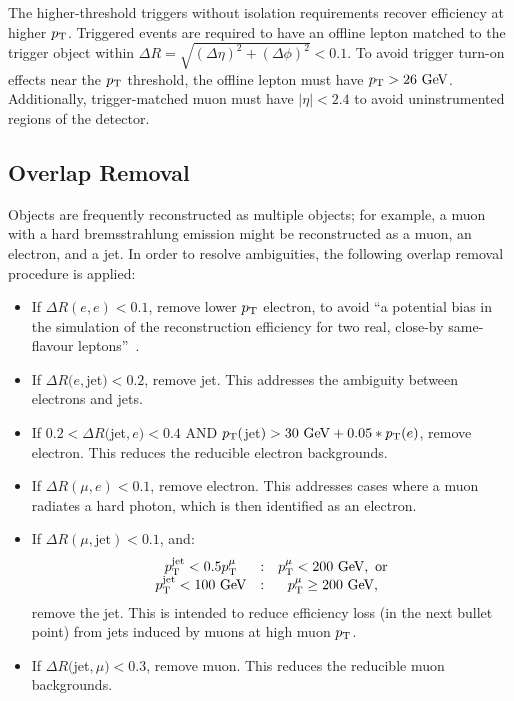 The higher-threshold triggers without isolation requirements recover efficiency at higher $p_{\text{T}}$. Triggered events are required to have an offline lepton matched to the trigger object within $\Delta R=\sqrt{(\Delta\eta)^2+(\Delta\phi)^2} < 0.1$. To avoid trigger turn-on effects near the $p_{\text{T}}$ threshold, the offline lepton must have $\pt>26 \GeV$. Additionally, trigger-matched muon must have $|\eta|<2.4$ to avoid uninstrumented regions of the detector.


\subsection{Overlap Removal}\label{sec:model-independent-overlap-removal}
Objects are frequently reconstructed as multiple objects; for example, a muon with a hard bremsstrahlung emission might be reconstructed as a muon, an electron, and a jet. In order to resolve ambiguities, the following overlap removal procedure is applied:

\begin{itemize}
	\item If $\Delta R(e, e) < 0.1$, remove lower $p_{\text{T}}$ electron, to avoid ``a potential bias in the simulation of the reconstruction efficiency for two real, close-by same-flavour leptons''~\cite{Adams:1700874}.
	\item If $\Delta R(e, $jet$) < 0.2$, remove jet. This addresses the ambiguity between electrons and jets.
	\item If $0.2 < \Delta R($jet$, e) < 0.4$ AND $p_{\text{T}}($jet$) > 30~\mbox{GeV} + 0.05 * p_{\text{T}}(e)$, remove electron. This reduces the reducible electron backgrounds.
	\item If $\Delta R(\mu, e) < 0.1$, remove electron. This addresses cases where a muon radiates a hard photon, which is then identified as an electron.
	\item If $\Delta R(\mu, \mbox{jet})<0.1$, and:
	\begin{equation}
		\begin{array}{ccc}
			p_{\text{T}}^{\mathrm{jet}}<0.5 p_{\text{T}}^{\mu} & : & p_{\text{T}}^{\mu} < 200~\mbox{GeV},\ \mbox{or} \\
			p_{\text{T}}^{\mathrm{jet}}<100~\mbox{GeV} & : & p_{\text{T}}^{\mu} \geq 200~\mbox{GeV},
		\end{array}
	\end{equation}
	remove the jet. This is intended to reduce efficiency loss (in the next bullet point) from jets induced by muons at high muon $p_{\text{T}}$. 
	\item If $\Delta R($jet$, \mu) < 0.3$, remove muon. This reduces the reducible muon backgrounds.
\end{itemize}

